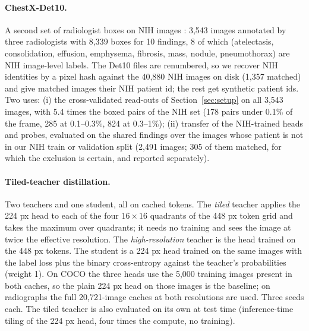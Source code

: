 \documentclass[10pt,letterpaper,twocolumn]{article}
\begin{document}
\paragraph{ChestX-Det10.}
A second set of radiologist boxes on NIH images \citep{liu2020chestxdet10}: 3,543 images
annotated by three radiologists with 8,339 boxes for 10 findings, 8 of which (atelectasis,
consolidation, effusion, emphysema, fibrosis, mass, nodule, pneumothorax) are NIH image-level
labels. The Det10 files are renumbered, so we recover NIH identities by a pixel hash against
the 40,880 NIH images on disk (1,357 matched) and give matched images their NIH patient id;
the rest get synthetic patient ids. Two uses: (i) the cross-validated read-outs of
Section~\ref{sec:setup} on all 3,543 images, with 5.4 times the boxed pairs of the NIH set
(178 pairs under 0.1\% of the frame, 285 at 0.1--0.3\%, 824 at 0.3--1\%); (ii) transfer of
the NIH-trained heads and probes, evaluated on the shared findings over the images whose
patient is not in our NIH train or validation split (2,491 images; 305 of them matched, for
which the exclusion is certain, and reported separately).

\paragraph{Tiled-teacher distillation.}
Two teachers and one student, all on cached tokens. The \emph{tiled} teacher applies the
224 px head to each of the four $16\times16$ quadrants of the 448 px token grid and takes the
maximum over quadrants; it needs no training and sees the image at twice the effective
resolution. The \emph{high-resolution} teacher is the head trained on the 448 px tokens. The
student is a 224 px head trained on the same images with the label loss plus the binary
cross-entropy against the teacher's probabilities (weight 1). On COCO the three heads use the
5,000 training images present in both caches, so the plain 224 px head on those images is the
baseline; on radiographs the full 20,721-image caches at both resolutions are used. Three
seeds each. The tiled teacher is also evaluated on its own at test time (inference-time
tiling of the 224 px head, four times the compute, no training).
\end{document}
